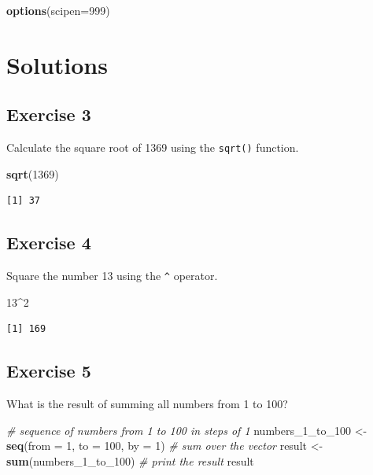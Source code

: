 \documentclass[]{book}
\newenvironment{Shaded}{\begin{snugshade}}{\end{snugshade}}
\newcommand{\KeywordTok}[1]{\textcolor[rgb]{0.13,0.29,0.53}{\textbf{#1}}}
\newcommand{\DataTypeTok}[1]{\textcolor[rgb]{0.13,0.29,0.53}{#1}}
\newcommand{\DecValTok}[1]{\textcolor[rgb]{0.00,0.00,0.81}{#1}}
\newcommand{\StringTok}[1]{\textcolor[rgb]{0.31,0.60,0.02}{#1}}
\newcommand{\CommentTok}[1]{\textcolor[rgb]{0.56,0.35,0.01}{\textit{#1}}}
\newcommand{\OperatorTok}[1]{\textcolor[rgb]{0.81,0.36,0.00}{\textbf{#1}}}
\newcommand{\NormalTok}[1]{#1}
\theoremstyle{definition}
\theoremstyle{definition}
\theoremstyle{definition}
\theoremstyle{remark}
\begin{document}
\begin{Shaded}
\begin{Highlighting}[]
\KeywordTok{options}\NormalTok{(}\DataTypeTok{scipen=}\DecValTok{999}\NormalTok{)}
\end{Highlighting}
\end{Shaded}

\section{Solutions}\label{solutions}

\subsection{Exercise 3}\label{exercise-3}

Calculate the square root of 1369 using the \texttt{sqrt()} function.

\begin{Shaded}
\begin{Highlighting}[]
\KeywordTok{sqrt}\NormalTok{(}\DecValTok{1369}\NormalTok{)}
\end{Highlighting}
\end{Shaded}

\begin{verbatim}
[1] 37
\end{verbatim}

\subsection{Exercise 4}\label{exercise-4}

Square the number 13 using the \texttt{\^{}} operator.

\begin{Shaded}
\begin{Highlighting}[]
\DecValTok{13}\OperatorTok{^}\DecValTok{2}
\end{Highlighting}
\end{Shaded}

\begin{verbatim}
[1] 169
\end{verbatim}

\subsection{Exercise 5}\label{exercise-5}

What is the result of summing all numbers from 1 to 100?

\begin{Shaded}
\begin{Highlighting}[]
\CommentTok{# sequence of numbers from 1 to 100 in steps of 1}
\NormalTok{numbers_1_to_}\DecValTok{100}\NormalTok{ <-}\StringTok{ }\KeywordTok{seq}\NormalTok{(}\DataTypeTok{from =} \DecValTok{1}\NormalTok{, }\DataTypeTok{to =} \DecValTok{100}\NormalTok{, }\DataTypeTok{by =} \DecValTok{1}\NormalTok{)}
\CommentTok{# sum over the vector}
\NormalTok{result <-}\StringTok{ }\KeywordTok{sum}\NormalTok{(numbers_1_to_}\DecValTok{100}\NormalTok{)}
\CommentTok{# print the result}
\NormalTok{result}
\end{Highlighting}
\end{Shaded}
\end{document}
